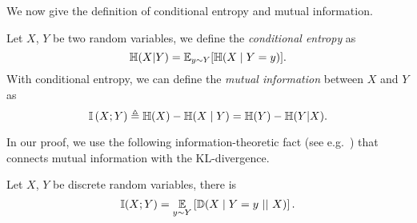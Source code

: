 We now give the definition of conditional entropy and mutual information.
\begin{definition}
	\label{def:mutual-info}
	Let $X$, $Y$ be two random variables, we define the \emph{conditional entropy} as \[\mathbb{H}(X|Y)=\mathbb{E}_{y \sim Y}[\mathbb{H}(X\mid Y=y)].\] 
	With conditional entropy, we can define the \emph{mutual information} between $X$ and $Y$ as \[\mathbb{I}\left(X;Y\right)\triangleq \mathbb{H}(X)-\mathbb{H}(X\mid Y) = \mathbb{H}(Y)-\mathbb{H}(Y|X).\]
\end{definition}



In our proof, we use the following information-theoretic fact (see e.g.~\cite{CoverT06}) that connects mutual information with the KL-divergence.
\begin{fact}
	\label{fct:mutual-info-and-kl}
	Let $X$, $Y$ be  discrete random variables, there is
	\[\mathbb{I}(X;Y) = \operatorname*{{\mathbb{E}}}_{y\sim Y}\left[\mathbb{D}(X\mid Y=y~||~X)\right].\]
\end{fact}


